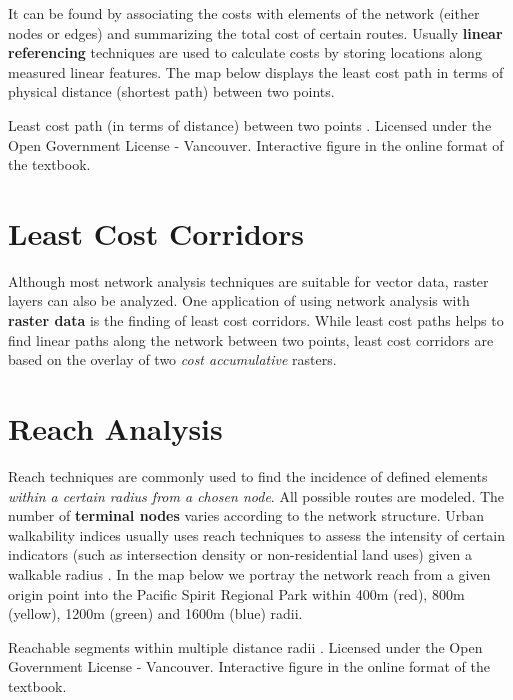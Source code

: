 \documentclass[
]{book}
\begin{document}
It can be found by associating the costs with elements of the network (either nodes or edges) and summarizing the total cost of certain routes. Usually \textbf{linear referencing} techniques are used to calculate costs by storing locations along measured linear features. The map below displays the least cost path in terms of physical distance (shortest path) between two points.

\label{fig:8-least-cost-path}Least cost path (in terms of distance) between two points \citep{city_of_vancouver_open_nodate}. Licensed under the Open Government License - Vancouver. Interactive figure in the online format of the textbook.

\hypertarget{least-cost-corridors}{%
\section{Least Cost Corridors}\label{least-cost-corridors}}

Although most network analysis techniques are suitable for vector data, raster layers can also be analyzed. One application of using network analysis with \textbf{raster data} is the finding of least cost corridors. While least cost paths helps to find linear paths along the network between two points, least cost corridors are based on the overlay of two \emph{cost accumulative} rasters.

\hypertarget{reach-analysis}{%
\section{Reach Analysis}\label{reach-analysis}}

Reach techniques are commonly used to find the incidence of defined elements \emph{within a certain radius from a chosen node}. All possible routes are modeled. The number of \textbf{terminal nodes} varies according to the network structure. Urban walkability indices usually uses reach techniques to assess the intensity of certain indicators (such as intersection density or non-residential land uses) given a walkable radius \citep{martino_spatial_2020}. In the map below we portray the network reach from a given origin point into the Pacific Spirit Regional Park within 400m (red), 800m (yellow), 1200m (green) and 1600m (blue) radii.

\label{fig:8-reach-analysis}Reachable segments within multiple distance radii \citep{city_of_vancouver_open_nodate}. Licensed under the Open Government License - Vancouver. Interactive figure in the online format of the textbook.
\end{document}
